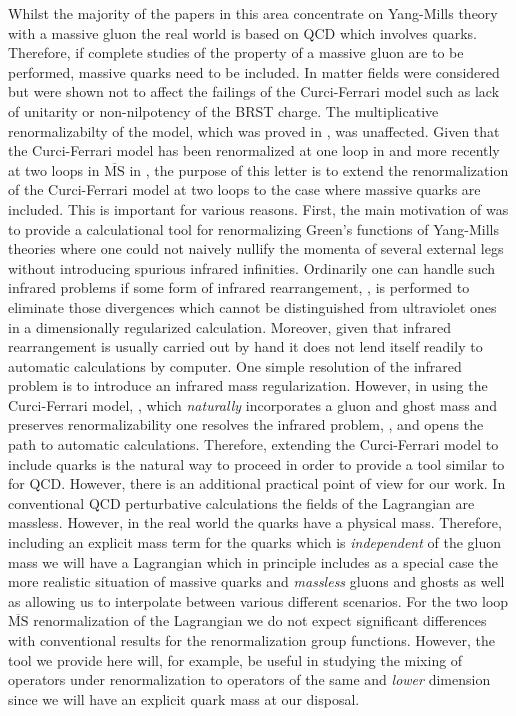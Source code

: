 \documentclass[a4paper,11pt]{article}
\newcommand{\MSbar}{\overline{\mbox{MS}}}
\begin{document}
Whilst the majority of the papers in this area concentrate on Yang-Mills theory
with a massive gluon the real world is based on QCD which involves quarks. 
Therefore, if complete studies of the property of a massive gluon are to be
performed, massive quarks need to be included. In \cite{6} matter fields were 
considered but were shown not to affect the failings of the Curci-Ferrari model
such as lack of unitarity or non-nilpotency of the BRST charge. The 
multiplicative renormalizabilty of the model, which was proved in 
\cite{4,8,9,10}, was unaffected. Given that the Curci-Ferrari model has been 
renormalized at one loop in \cite{8,12,15} and more recently at two loops in 
$\MSbar$ in \cite{16}, the purpose of this letter is to extend the 
renormalization of the Curci-Ferrari model at two loops to the case where 
massive quarks are included. This is important for various reasons. First, the 
main motivation of \cite{16} was to provide a calculational tool for 
renormalizing Green's functions of Yang-Mills theories where one could not 
naively nullify the momenta of several external legs without introducing 
spurious infrared infinities. Ordinarily one can handle such infrared problems
if some form of infrared rearrangement, \cite{15,16}, is performed to eliminate
those divergences which cannot be distinguished from ultraviolet ones in a 
dimensionally regularized calculation. Moreover, given that infrared 
rearrangement is usually carried out by hand it does not lend itself readily to
automatic calculations by computer. One simple resolution of the infrared 
problem is to introduce an infrared mass regularization. However, in using the 
Curci-Ferrari model, \cite{4}, which {\em naturally} incorporates a gluon and 
ghost mass and preserves renormalizability one resolves the infrared problem, 
\cite{19,10,15}, and opens the path to automatic calculations. Therefore, 
extending the Curci-Ferrari model to include quarks is the natural way to 
proceed in order to provide a tool similar to \cite{14} for QCD. However, there
is an additional practical point of view for our work. In conventional QCD 
perturbative calculations the fields of the Lagrangian are massless. However, 
in the real world the quarks have a physical mass. Therefore, including an 
explicit mass term for the quarks which is {\em independent} of the gluon mass 
we will have a Lagrangian which in principle includes as a special case the 
more realistic situation of massive quarks and {\em massless} gluons and ghosts
as well as allowing us to interpolate between various different scenarios. For 
the two loop $\MSbar$ renormalization of the Lagrangian we do not expect 
significant differences with conventional results for the renormalization group
functions. However, the tool we provide here will, for example, be useful in 
studying the mixing of operators under renormalization to operators of the same
and {\em lower} dimension since we will have an explicit quark mass at our 
disposal. 
\end{document}
